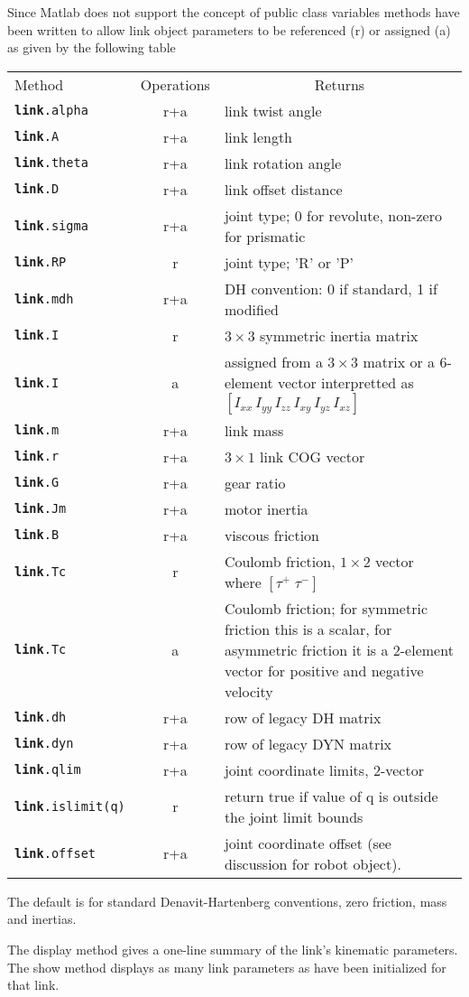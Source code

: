 \documentclass{article}
\newcommand{\var}[1]{{\vtt #1}}
\begin{document}
{Since Matlab does not support the concept of public class variables methods have
been written to allow link object parameters to be referenced (r) or assigned
(a) as given by the following table
 
\begin{center}
\begin{tabular}{lcp{6cm}}
Method          & Operations & \multicolumn{1}{c|}{Returns} \\
\tt \textbf{link}.alpha	&r+a&  link twist angle \\	
\tt \textbf{link}.A		&r+a&   link length \\
\tt \textbf{link}.theta	&r+a&   link rotation angle \\
\tt \textbf{link}.D		&r+a&   link offset distance \\
\tt \textbf{link}.sigma	&r+a&  joint type; 0 for revolute, non-zero for prismatic\\
\tt \textbf{link}.RP		&r&  joint type; 'R' or 'P'\\
\tt \textbf{link}.mdh	&r+a& DH convention: 0 if standard, 1 if modified\\ \hline
\tt \textbf{link}.I		&r& $3 \times 3$ symmetric inertia matrix\\
\tt \textbf{link}.I		&a& assigned from a $3 \times 3$  matrix or a 6-element vector
interpretted as $[I_{xx} \, I_{yy} \, I_{zz} \, I_{xy} \, I_{yz} \, I_{xz} ]$\\
\tt \textbf{link}.m		&r+a& link mass\\
\tt \textbf{link}.r		&r+a& $3 \times 1$ link COG vector \\ \hline
\tt \textbf{link}.G		&r+a& gear ratio\\
\tt \textbf{link}.Jm		&r+a& motor inertia\\
\tt \textbf{link}.B		&r+a& viscous friction\\
\tt \textbf{link}.Tc		&r& Coulomb friction, $1\times 2$ vector
where $[\tau^+ \; \tau^-]$\\ 
\tt \textbf{link}.Tc		&a& Coulomb friction; for symmetric friction
this is a scalar, for asymmetric friction it is a 2-element vector for
positive and negative velocity \\ \hline
\tt \textbf{link}.dh		&r+a&  row of legacy DH matrix \\
\tt \textbf{link}.dyn	&r+a& row of legacy DYN matrix \\
\tt \textbf{link}.qlim	&r+a& joint coordinate limits, 2-vector \\
\tt \textbf{link}.islimit(q)	&r& return true if value of \var{q} is outside
			the joint limit bounds\\
\tt \textbf{link}.offset	&r+a& joint coordinate offset (see discussion for
\var{robot} object).
\end{tabular}
\end{center} 

The default is for standard Denavit-Hartenberg conventions, zero friction,
mass and inertias.

The \var{display} method gives a one-line summary of the link's kinematic
parameters.
The \var{show} method displays as many link parameters as have been initialized
for that link.
}
\end{document}
